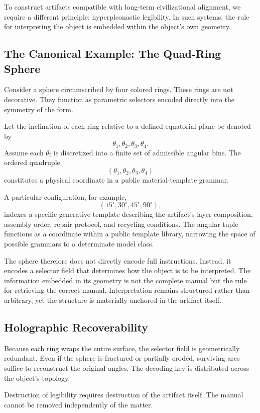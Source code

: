 \documentclass[11pt]{article}
\begin{document}
To construct artifacts compatible with long-term civilizational 
alignment, we require a different principle: hyperpleonastic legibility. 
In such systems, the rule for interpreting the object is embedded within 
the object's own geometry.

\subsection{The Canonical Example: The Quad-Ring Sphere}

Consider a sphere circumscribed by four colored rings. These rings are 
not decorative. They function as parametric selectors encoded directly 
into the symmetry of the form.

Let the inclination of each ring relative to a defined equatorial plane 
be denoted by
\[
\theta_1, \theta_2, \theta_3, \theta_4.
\]
Assume each $\theta_i$ is discretized into a finite set of admissible 
angular bins. The ordered quadruple
\[
(\theta_1, \theta_2, \theta_3, \theta_4)
\]
constitutes a physical coordinate in a public material-template grammar.

A particular configuration, for example,
\[
(15^\circ, 30^\circ, 45^\circ, 90^\circ),
\]
indexes a specific generative template describing the artifact's
layer composition, assembly order, repair protocol, and recycling
conditions. The angular tuple functions as a coordinate within a
public template library, narrowing the space of possible grammars
to a determinate model class.

The sphere therefore does not directly encode full instructions.
Instead, it encodes a selector field that determines how the object
is to be interpreted. The information embedded in its geometry is not
the complete manual but the rule for retrieving the correct manual.
Interpretation remains structured rather than arbitrary, yet the
structure is materially anchored in the artifact itself.

\subsection{Holographic Recoverability}

Because each ring wraps the entire surface, the selector field is 
geometrically redundant. Even if the sphere is fractured or partially 
eroded, surviving arcs suffice to reconstruct the original angles. 
The decoding key is distributed across the object's topology.

Destruction of legibility requires destruction of the artifact itself. 
The manual cannot be removed independently of the matter.
\end{document}
